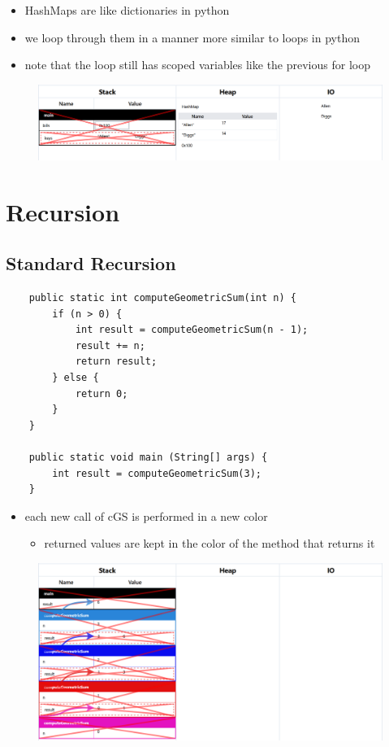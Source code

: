 \documentclass{article}
\begin{document}
\begin{itemize}
	\item HashMaps are like dictionaries in python
	\item we loop through them in a manner more similar to loops in python
	\item note that the loop still has scoped variables like the previous for loop
\end{itemize}

\begin{figure}[H]
	\centering
	\includegraphics{hashMaps.png}
\end{figure}

\pagebreak


\section{Recursion}

\subsection{Standard Recursion}

\begin{verbatim}
	public static int computeGeometricSum(int n) {
	    if (n > 0) {
	        int result = computeGeometricSum(n - 1);
	        result += n;
	        return result;
	    } else {
	        return 0;
	    }
	}

	public static void main (String[] args) {
	    int result = computeGeometricSum(3);
	}
\end{verbatim}

\begin{itemize}
	\item each new call of cGS is performed in a new color
	\begin{itemize}
		\item returned values are kept in the color of the method that returns it
	\end{itemize}
\end{itemize}

\begin{figure}[H]
	\centering
	\includegraphics{recursionStandard.png}
\end{figure}
\end{document}
